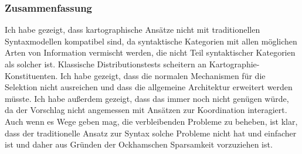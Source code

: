 \subsubsection{Zusammenfassung}

Ich habe gezeigt, dass kartographische Ansätze nicht mit traditionellen Syntaxmodellen kompatibel sind, da
syntaktische Kategorien mit allen möglichen Arten von Information vermischt werden, die nicht Teil syntaktischer
Kategorien als solcher ist. Klassische Distributionstests scheitern an Kartographie-Konstituenten. Ich habe gezeigt, dass
die normalen Mechanismen für die Selektion nicht ausreichen und dass die allgemeine Architektur
erweitert werden müsste. Ich habe außerdem gezeigt, dass das immer noch nicht genügen würde, da der Vorschlag nicht
angemessen mit Ansätzen zur Koordination interagiert. Auch wenn es Wege geben mag, die verbleibenden
Probleme zu beheben, ist klar, dass der traditionelle Ansatz zur Syntax solche Probleme nicht hat und
einfacher ist und daher aus Gründen der Ockhamschen Sparsamkeit vorzuziehen ist.


